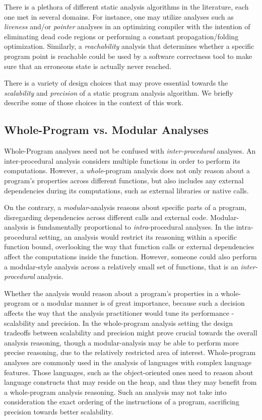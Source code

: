 %
%

There is a plethora of different static analysis algorithms in the literature, each one
met in several domains. For instance, one may utilize analyses such as \emph{liveness} and/or
\emph{pointer} analyses in an optimizing compiler with the intention of eliminating
dead code regions or performing a constant propagation/folding optimization.
Similarly, a \emph{reachability} analysis that determines whether a specific program point is
reachable could be used by a software correctness tool to make sure that
an erroneous state is actually never reached.

There is a variety of design choices that may prove essential towards the \emph{scalability}
and \emph{precision} of a static program analysis algorithm. We briefly describe some of
those choices in the context of this work.

\subsection{Whole-Program vs. Modular Analyses}

Whole-Program analyses need not be confused with \emph{inter-procedural} analyses.
An inter-procedural analysis considers multiple functions in order to perform
its computations. However, a \emph{whole}-program analysis does not only reason
about a program's properties across different functions, but also includes any
external dependencies during its computations, such as external libraries or
native calls.

On the contrary, a \emph{modular}-analysis reasons about specific parts of a
program, disregarding dependencies across different calls and external code.
Modular-analysis is fundamentally proportional to \emph{intra}-procedural analyses.
In the intra-procedural setting, an analysis would restrict its reasoning within
a specific function bound, overlooking the way that function calls or external
dependencies affect the computations inside the function. However, someone could
also perform a modular-style analysis across a relatively small set of functions,
that is an \emph{inter-procedural} analysis.

Whether the analysis would reason about a program's properties in a whole-program
or a modular manner is of great importance, because such a decision affects the
way that the analysis practitioner would tune its performance - scalability and
precision. In the whole-program analysis setting the design tradeoffs between
scalability and precision might prove crucial towards the overall analysis
reasoning, though a modular-analysis may be able to perform more precise reasoning,
due to the relatively restricted area of interest. Whole-program analyses are
commonly used in the analysis of languages with complex language features. Those
languages, such as the object-oriented ones need to reason about language constructs
that may reside on the heap, and thus they may benefit from a whole-program analysis
reasoning. Such an analysis may not take into consideration the
exact ordering of the instructions of a program, sacrificing precision towards
better scalability.

